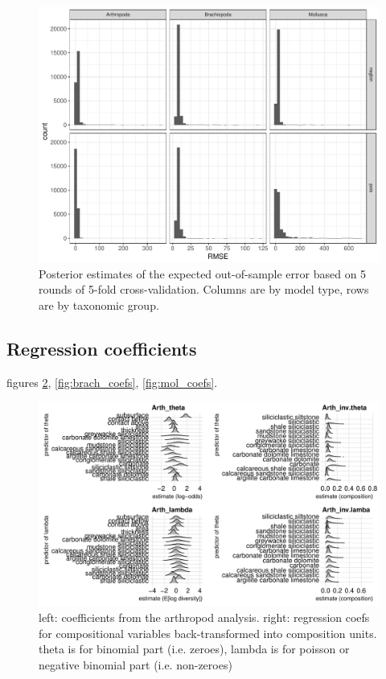 \documentclass[12pt,letterpaper]{article}
\begin{document}
\afterpage{\clearpage}
\begin{figure}[h]
  \centering
  \includegraphics[width=\textwidth,height=0.8\textheight,keepaspectratio=true]{figure/cv_rmse}
  \caption{Posterior estimates of the expected out-of-sample error based on 5 rounds of 5-fold cross-validation. Columns are by model type, rows are by taxonomic group.}
  \label{fig:cv_rmse}
\end{figure}


\subsection{Regression coefficients}
figures \ref{fig:arth_coefs}, \ref{fig:brach_coefs}, \ref{fig:mol_coefs}.

\afterpage{\clearpage}
\begin{figure}[h]
  \centering
  \includegraphics[width=\textwidth,height=0.8\textheight,keepaspectratio=true]{figure/arth_coefs}
  \caption{left: coefficients from the arthropod analysis. right: regression coefs for compositional variables back-transformed into composition units. theta is for binomial part (i.e. zeroes), lambda is for poisson or negative binomial part (i.e. non-zeroes)}
  \label{fig:arth_coefs}
\end{figure}
\end{document}
